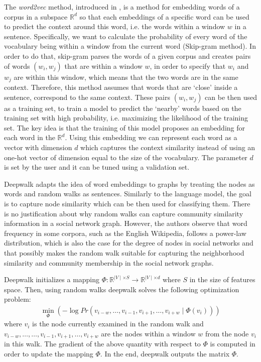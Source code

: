 The \emph{word2vec} method, introduced in \cite{mikolov2013efficient}, is a 
method for embedding words of a corpus in a subspace $\mathbb{R}^d$ so that 
each embeddings of a specific word can be used to predict the context around this 
word, i.e. the words within a window $w$ in a sentence. Specifically, we 
want to calculate the probability of every word of the vocabulary being 
within a window from the current word (Skip-gram method).  
In order to do that, skip-gram parses the words of a given corpus and creates 
pairs of words $(w_i, w_j)$ that are within a window $w$, in order to specify 
that $w_i$ and $w_j$ are within this window, which means that the two words 
are in the same context. Therefore, this method assumes that words that are 
`close' inside a sentence, correspond to the same context. These pairs 
$(w_i, w_j)$ can be then used as a training set, to train a model to predict the 
`nearby' words based on the training set with high probability, i.e. maximizing 
the likelihood of the training set. The key idea is that the training of this 
model proposes an embedding for each word in the $\mathbb{R}^d$. 
Using this embedding we can represent each word as a vector with dimension $d$ 
which captures the context similarity instead of using an one-hot vector of 
dimension equal to the size of the vocabulary. The parameter $d$ is set by the 
user and it can be tuned using a validation set.

Deepwalk adapts the idea of word embeddings to graphs by treating the nodes as 
words and random walks as sentences. Similarly to the language model, the goal 
is to capture node similarity which can be then used for classifying them. 
There is no justification about why random walks can capture community 
similarity information in a social network graph. However, the authors 
observe that word frequency in some corpora, such as the English Wikipedia, 
follows a power-law distribution, which is also the case for the degree of nodes 
in social networks and that
possibly makes the random walk suitable for capturing the neighborhood 
similarity and community membership in the social network graphs.

Deepwalk initializes a mapping 
$\Phi: \mathbb{R}^{\mid V \mid \times S} \to \mathbb{R}^{\mid V\mid \times d}$ 
where $S$ in the size of features space. Then, using random walks deepwalk solves 
the following optimization problem:
\begin{align}
    \min_{\Phi}
        \left (-\log{Pr({v_{i-w}, 
                \ldots, v_{i-1}, v_{i+1}, 
                \ldots , v_{i+w}} \mid \Phi(v_i))} 
        \right )
\end{align}
where $v_i$ is the node currently examined in the random walk and 
$v_{i-w}, \ldots, \ldots, v_{i-1}, v_{i+1},\ldots, v_{i+w}$ are the nodes 
within a window $w$ from the node $v_i$ in this walk. The gradient of the above 
quantity with respect to $\Phi$ is 
computed in order to update the mapping $\Phi$. In the end, deepwalk outputs 
the matrix $\Phi$.

